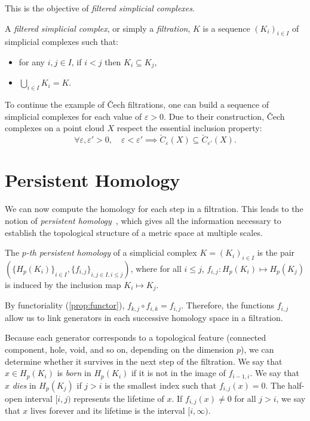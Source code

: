 \documentclass[a4paper,11pt,openany,extrafontsizes]{memoir}
\begin{document}
This is the objective of \emph{filtered simplicial complexes}.

\begin{defn}[Filtration]\label{defn:filt}
  A \emph{filtered simplicial complex}, or simply a \emph{filtration},
  $K$ is a sequence ${(K_i)}_{i\in I}$ of simplicial complexes such
  that:
  \begin{itemize}
  \item for any $i, j \in I$, if $i < j$ then $K_i \subseteq K_j$,
  \item $\bigcup_{i\in I} K_i = K$.
  \end{itemize}
\end{defn}

To continue the example of Čech filtrations, one can build a sequence
of simplicial complexes for each value of $\varepsilon > 0$. Due to
their construction, Čech complexes on a point cloud $X$ respect the
essential inclusion property:
\[ \forall \varepsilon, \varepsilon' > 0,\quad \varepsilon < \varepsilon'
  \implies \check{C}_\varepsilon(X) \subseteq
  \check{C}_{\varepsilon'}(X). \]

\section{Persistent Homology}%
\label{sec:persistent-homology}

We can now compute the homology for each step in a filtration. This
leads to the notion of \emph{persistent
  homology}~\cite{carlsson_topology_2009, zomorodian_computing_2005},
which gives all the information necessary to establish the topological
structure of a metric space at multiple scales.

\begin{defn}
  The \emph{$p$-th persistent homology} of a simplicial complex
  $K = {(K_i)}_{i\in I}$ is the pair
  $({\{H_p(K_i)\}}_{i\in I}, {\{f_{i,j}\}}_{i,j\in I, i\leq j})$, where
  for all $i\leq j$, $f_{i,j} : H_p(K_i) \mapsto H_p(K_j)$ is induced
  by the inclusion map $K_i \mapsto K_j$.
\end{defn}

By functoriality (\autoref{prop:functor}),
$f_{k,j} \circ f_{i,k} = f_{i,j}$. Therefore, the functions $f_{i,j}$
allow us to link generators in each successive homology space in a
filtration.

Because each generator corresponds to a topological feature (connected
component, hole, void, and so on, depending on the dimension $p$), we
can determine whether it survives in the next step of the
filtration. We say that $x \in H_p(K_i)$ is \emph{born} in $H_p(K_i)$
if it is not in the image of $f_{i-1,i}$. We say that $x$ \emph{dies}
in $H_p(K_j)$ if $j > i$ is the smallest index such that
$f_{i,j}(x) = 0$. The half-open interval $[i, j)$ represents the
lifetime of $x$. If $f_{i,j}(x) \neq 0$ for all $j > i$, we say that
$x$ lives forever and its lifetime is the interval $[i, \infty)$.
\end{document}
